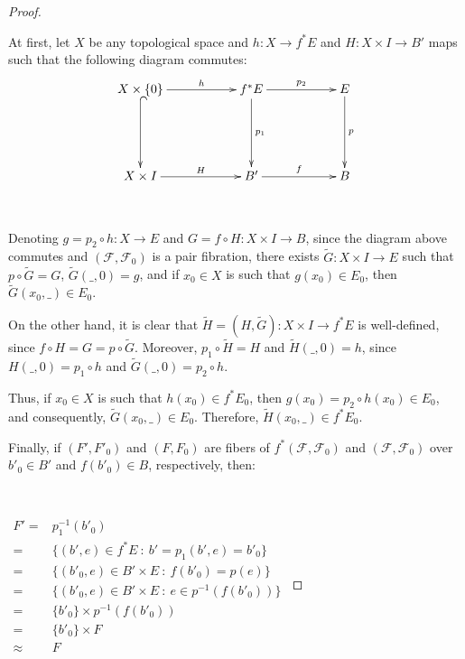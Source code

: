 \documentclass[12pt,oneside]{book}
\begin{document}
    \begin{proof}
    
    \

        At first, let $X$ be any topological space and $h:X\to f^{*}E$ and $H:X\times I\to B'$ maps such that the following diagram commutes:
        $$\xymatrix @C=0.5cm {
            X\times\{ 0 \} \ar[rrr]^-{h} \ar@{^(->}[dd] &&& f^{*}E \ar[rrr]^-{p_{2}} \ar[dd]^-{p_{1}} &&& E \ar[dd]^-{p} \\
            &&& &&& \\
            X\times I \ar[rrr]^-{H} &&& B' \ar[rrr]^-{f} &&& B
        }$$

        \
        
        Denoting $g=p_{2}\circ h:X\to E$ and $G=f\circ H:X\times I\to B$, since the diagram above commutes and 
        $(\mathcal{F},\mathcal{F}_{0})$ is a pair fibration, there exists $\widetilde{G}:X\times I\to E$ such that 
        $p\circ\widetilde{G}=G$, $\widetilde{G}(\_,0)=g$, and if $x_{0}\in X$ is such that $g(x_{0})\in E_{0}$, then 
        $\widetilde{G}(x_{0},\_)\in E_{0}$.
        
        On the other hand, it is clear that $\widetilde{H}=(H,\widetilde{G}):X\times I\to f^{*}E$ is well-defined, since 
        $f\circ H=G=p\circ\widetilde{G}$. Moreover, $p_{1}\circ\widetilde{H}=H$ and $\widetilde{H}(\_,0)=h$, since $H(\_,0)=p_{1}\circ h$ 
        and $\widetilde{G}(\_,0)=p_{2}\circ h$.
        
        Thus, if $x_{0}\in X$ is such that $h(x_{0})\in f^{*}E_{0}$, then $g(x_{0})=p_{2}\circ h(x_{0})\in E_{0}$, and consequently, 
        $\widetilde{G}(x_{0},\_)\in E_{0}$. Therefore, $\widetilde{H}(x_{0},\_)\in f^{*}E_{0}$.
        
        Finally, if $(F',F'_{0})$ and $(F,F_{0})$ are fibers of $f^{*}(\mathcal{F},\mathcal{F}_{0})$ and $(\mathcal{F},\mathcal{F}_{0})$ 
        over $b'_{0}\in B'$ and $f(b'_{0})\in B$, respectively, then:

        \
        
        $\begin{array}{rl}
            F' = & p_{1}^{-1}(b'_{0}) \\
            = & \{ (b',e)\in f^{*}E \ : \ b'=p_{1}(b',e)=b'_{0} \} \\
            = & \{ (b'_{0},e)\in B'\times E \ : \ f(b'_{0})=p(e) \} \\
            = & \{ (b'_{0},e)\in B'\times E \ : \ e\in p^{-1}(f(b'_{0})) \} \\
            = & \{ b'_{0} \}\times p^{-1}(f(b'_{0})) \\
            = & \{ b'_{0} \}\times F \\
            \approx & F
        \end{array}$
        

\end{proof}
\end{document}
